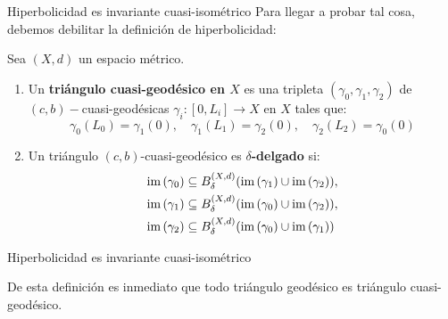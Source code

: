 \documentclass[xcolor=dvipsnames]{beamer}
\theoremstyle{largebreak}
\newcommand\cf[3]{\ensuremath{#1:#2\rightarrow#3}}
\newcommand{\im}[1]{\ensuremath{\textup{im}\left(#1\right)}}
\begin{document}
\begin{frame}{Hiperbolicidad es invariante cuasi-isométrico}
    Para llegar a probar tal cosa, debemos debilitar la definición de hiperbolicidad:
    
    \begin{mydef}
        Sea $(X,d)$ un espacio métrico.
        \begin{enumerate}[label = \textit{\arabic*}]
            \item Un \textbf{triángulo cuasi-geodésico en $X$} es una tripleta $(\gamma_0,\gamma_1,\gamma_2)$ de $(c,b)-$cuasi-geodésicas $\cf{\gamma_i}{[0,L_i]}{X}$ en $X$ tales que:
            \begin{equation*}
                \gamma_0(L_0)=\gamma_1(0),\quad \gamma_1(L_1)=\gamma_2(0),\quad \gamma_2(L_2)=\gamma_0(0)
            \end{equation*}
            \item Un triángulo $(c,b)$-cuasi-geodésico es \textbf{$\delta$-delgado} si:
            \begin{equation*}
                \begin{split}
                    \im{\gamma_0}&\subseteq B_{\delta}^{(X,d)}(\im{\gamma_1}\cup\im{\gamma_2}),\\
                    \im{\gamma_1}&\subseteq B_{\delta}^{(X,d)}(\im{\gamma_0}\cup\im{\gamma_2}),\\
                    \im{\gamma_2}&\subseteq B_{\delta}^{(X,d)}(\im{\gamma_0}\cup\im{\gamma_1})\\
                \end{split}
            \end{equation*}
        \end{enumerate}
    \end{mydef}
\end{frame}

\begin{frame}{Hiperbolicidad es invariante cuasi-isométrico}

    \begin{obs}
        De esta definición es inmediato que todo triángulo geodésico es triángulo cuasi-geodésico.
    \end{obs}
\end{frame}
\end{document}
